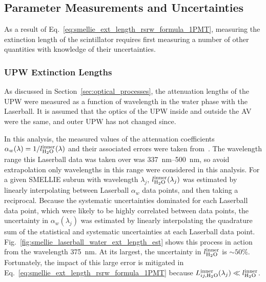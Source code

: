 \subsection{Parameter Measurements and Uncertainties}\label{sec:smellie_ext_length_params_and_uncs}
As a result of Eq.~\ref{eq:smellie_ext_length_rsrw_formula_1PMT}, measuring the extinction length of the scintillator requires first measuring a number of other quantities with knowledge of their uncertainties.

\subsubsection{UPW Extinction Lengths}
As discussed in Section~\ref{sec:optical_processes}, the attenuation lengths of the UPW were measured as a function of wavelength in the water phase with the Laserball. It is assumed that the optics of the UPW inside and outside the AV were the same, and outer UPW has not changed since.

In this analysis, the measured values of the attenuation coefficients $\alpha_{w}(\lambda) = 1/l_{\ce{H_{2}O}}^{\mathrm{inner}}(\lambda)$ and their associated errors were taken from~\cite{andersonOpticalCalibrationSNO2021}. The wavelength range this Laserball data was taken over was \SIrange{337}{500}{\nm}, so avoid extrapolation only wavelengths in this range were considered in this analysis. For a given SMELLIE subrun with wavelength $\lambda_{j}$, $l_{\ce{H_{2}O}}^{\mathrm{inner}}(\lambda_{j})$ was estimated by linearly interpolating between Laserball $\alpha_{w}$ data points, and then taking a reciprocal. Because the systematic uncertainties dominated for each Laserball data point, which were likely to be highly correlated between data points, the uncertainty in $\alpha_{w}(\lambda_{j})$ was estimated by linearly interpolating the quadrature sum of the statistical and systematic uncertainties at each Laserball data point. Fig.~\ref{fig:smellie_laserball_water_ext_length_est} shows this process in action from the wavelength \SI{375}{\nm}. At its largest, the uncertainty in $l_{\ce{H_{2}O}}^{\mathrm{inner}}$ is $\sim50\%$. Fortunately, the impact of this large error is mitigated in Eq.~\ref{eq:smellie_ext_length_rsrw_formula_1PMT} because $L_{ij,\ce{H_{2}O}}^{\mathrm{inner}}(\lambda_{j})\ll l_{\ce{H_{2}O}}^{\mathrm{inner}}$.

